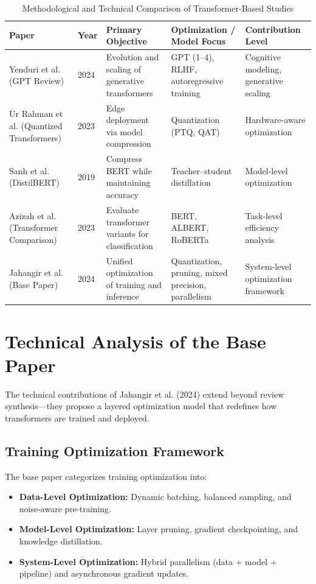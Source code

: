 \begin{table}[h!]
\centering
\caption{Methodological and Technical Comparison of Transformer-Based Studies}
\label{tab:comparison}
\begin{tabular}{|p{3cm}|p{2cm}|p{3.5cm}|p{3cm}|p{3cm}|}
\hline
\textbf{Paper} & \textbf{Year} & \textbf{Primary Objective} & \textbf{Optimization / Model Focus} & \textbf{Contribution Level} \\ \hline
Yenduri et al. (GPT Review) & 2024 & Evolution and scaling of generative transformers & GPT (1–4), RLHF, autoregressive training & Cognitive modeling, generative scaling \\ \hline
Ur Rahman et al. (Quantized Transformers) & 2023 & Edge deployment via model compression & Quantization (PTQ, QAT) & Hardware-aware optimization \\ \hline
Sanh et al. (DistilBERT) & 2019 & Compress BERT while maintaining accuracy & Teacher–student distillation & Model-level optimization \\ \hline
Azizah et al. (Transformer Comparison) & 2023 & Evaluate transformer variants for classification & BERT, ALBERT, RoBERTa & Task-level efficiency analysis \\ \hline
Jahangir et al. (Base Paper) & 2024 & Unified optimization of training and inference & Quantization, pruning, mixed precision, parallelism & System-level optimization framework \\ \hline
\end{tabular}
\end{table}

\newpage
\section{Technical Analysis of the Base Paper}

The technical contributions of Jahangir et al. (2024) extend beyond review synthesis—they propose a layered optimization model that redefines how transformers are trained and deployed.

\subsection{Training Optimization Framework}
The base paper categorizes training optimization into:
\begin{itemize}
    \item \textbf{Data-Level Optimization:} Dynamic batching, balanced sampling, and noise-aware pre-training.
    \item \textbf{Model-Level Optimization:} Layer pruning, gradient checkpointing, and knowledge distillation.
    \item \textbf{System-Level Optimization:} Hybrid parallelism (data + model + pipeline) and asynchronous gradient updates.
\end{itemize}

